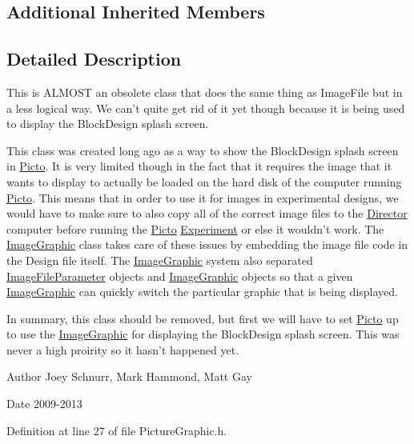 \subsection*{Additional Inherited Members}


\subsection{Detailed Description}
This is A\-L\-M\-O\-S\-T an obsolete class that does the same thing as Image\-File but in a less logical way. We can't quite get rid of it yet though because it is being used to display the Block\-Design splash screen. 

This class was created long ago as a way to show the Block\-Design splash screen in \hyperlink{namespace_picto}{Picto}. It is very limited though in the fact that it requires the image that it wants to display to actually be loaded on the hard disk of the computer running \hyperlink{namespace_picto}{Picto}. This means that in order to use it for images in experimental designs, we would have to make sure to also copy all of the correct image files to the \hyperlink{class_director}{Director} computer before running the \hyperlink{namespace_picto}{Picto} \hyperlink{class_picto_1_1_experiment}{Experiment} or else it wouldn't work. The \hyperlink{class_picto_1_1_image_graphic}{Image\-Graphic} class takes care of these issues by embedding the image file code in the Design file itself. The \hyperlink{class_picto_1_1_image_graphic}{Image\-Graphic} system also separated \hyperlink{class_picto_1_1_image_file_parameter}{Image\-File\-Parameter} objects and \hyperlink{class_picto_1_1_image_graphic}{Image\-Graphic} objects so that a given \hyperlink{class_picto_1_1_image_graphic}{Image\-Graphic} can quickly switch the particular graphic that is being displayed.

In summary, this class should be removed, but first we will have to set \hyperlink{namespace_picto}{Picto} up to use the \hyperlink{class_picto_1_1_image_graphic}{Image\-Graphic} for displaying the Block\-Design splash screen. This was never a high proirity so it hasn't happened yet. \begin{DoxyAuthor}{Author}
Joey Schnurr, Mark Hammond, Matt Gay 
\end{DoxyAuthor}
\begin{DoxyDate}{Date}
2009-\/2013 
\end{DoxyDate}


Definition at line 27 of file Picture\-Graphic.\-h.



